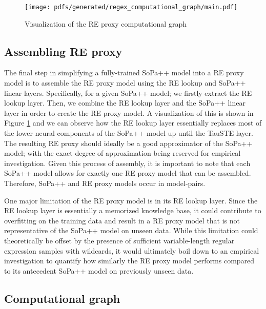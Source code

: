 \begin{figure}[t!]
  \centering
  \texttt{[image: pdfs/generated/regex\_computational\_graph/main.pdf]}
  \caption{Visualization of the RE proxy computational graph}
  \label{fig:regex_cg}
\end{figure}

\subsection{Assembling RE proxy}

The final step in simplifying a fully-trained SoPa++ model into a RE proxy model
is to assemble the RE proxy model using the RE lookup and SoPa++ linear layers.
Specifically, for a given SoPa++ model; we firstly extract the RE lookup layer.
Then, we combine the RE lookup layer and the SoPa++ linear layer in order to
create the RE proxy model. A visualization of this is shown in Figure
\ref{fig:regex_cg} and we can observe how the RE lookup layer essentially
replaces most of the lower neural components of the SoPa++ model up until the
TauSTE layer. The resulting RE proxy should ideally be a good approximator of
the SoPa++ model; with the exact degree of approximation being reserved for
empirical investigation. Given this process of assembly, it is important to note
that each SoPa++ model allows for exactly one RE proxy model that can be
assembled. Therefore, SoPa++ and RE proxy models occur in model-pairs.

One major limitation of the RE proxy model is in its RE lookup layer. Since the
RE lookup layer is essentially a memorized knowledge base, it could contribute
to overfitting on the training data and result in a RE proxy model that is not
representative of the SoPa++ model on unseen data. While this limitation could
theoretically be offset by the presence of sufficient variable-length regular
expression samples with wildcards, it would ultimately boil down to an empirical
investigation to quantify how similarly the RE proxy model performs compared to
its antecedent SoPa++ model on previously unseen data.

\subsection{Computational graph}

